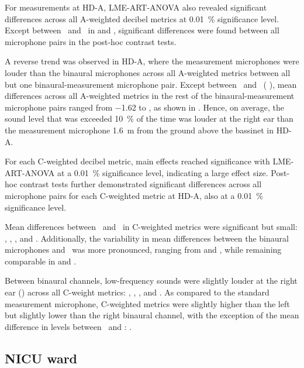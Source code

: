 For measurements at HD-A, LME-ART-ANOVA also revealed significant differences across all A-weighted decibel metrics at \SI{0.01}{\percent} significance level. Except between \binL\ and \binR\ in  and , significant differences were found between all microphone pairs in the post-hoc contrast tests. 

A reverse trend was observed in HD-A, where the measurement microphones were louder than the binaural microphones across all A-weighted metrics between all but one binaural-measurement microphone pair. Except between \binR\ and \GRASOut\ ( \dba{}), mean differences across all A-weighted metrics in the rest of the binaural-measurement microphone pairs ranged from \num{-1.62} to , as shown in . Hence, on average, the sound level that was exceeded \SI{10}{\percent} of the time was louder at the right ear than the measurement microphone \SI{1.6}{\meter} from the ground above the bassinet in HD-A. 

For each C-weighted decibel metric, main effects reached significance with LME-ART-ANOVA at a \SI{0.01}{\percent} significance level, indicating a large effect size. Post-hoc contrast tests further demonstrated significant differences across all microphone pairs for each C-weighted metric at HD-A, also at a \SI{0.01}{\percent} significance level.

Mean differences between \binL\ and \binR\ in C-weighted metrics were significant but small: , , , and  \dbc{}. Additionally, the variability in mean differences between the binaural microphones and \GRASOut\ was more pronounced, ranging from  and , while remaining comparable in  and . 

Between binaural channels, low-frequency sounds were slightly louder at the right ear (\binL) across all C-weight metrics: , , , and  \dbc{}. As compared to the standard measurement microphone, C-weighted metrics were slightly higher than the left but slightly lower than the right binaural channel, with the exception of the mean difference in  levels between \binR\ and \GRASOut:  \dbc{}.

\subsection{NICU ward}


